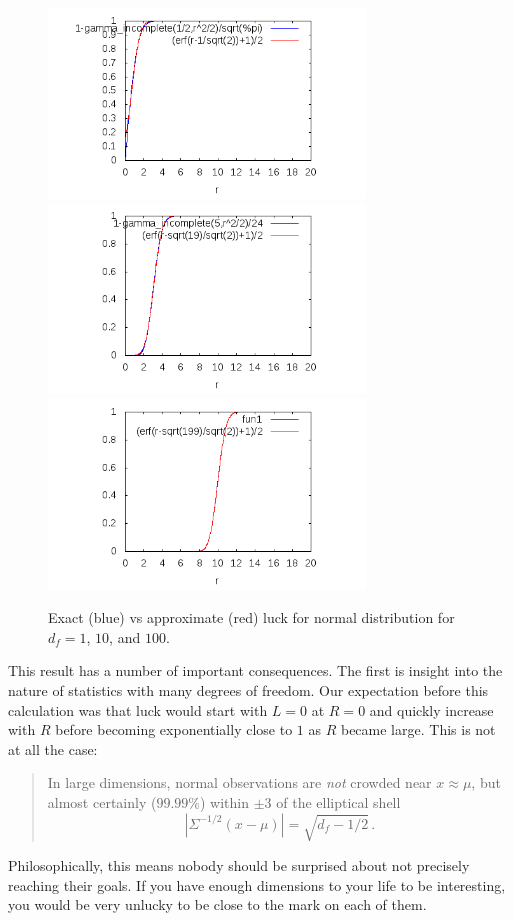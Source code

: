 \begin{figure}
  \caption{Exact (blue) vs approximate (red) luck for normal distribution for $d_f=1$, $10$, and $100$.}
  \centering
    \includegraphics[width=0.75\textwidth]{img/luck1}
    \includegraphics[width=0.75\textwidth]{img/luck10}
    \includegraphics[width=0.75\textwidth]{img/luck100}
\end{figure}

This result has a number of important consequences.  The first is insight into the nature of statistics with many degrees of freedom.  Our expectation before this calculation was that luck would start with $L=0$ at $R=0$ and quickly increase with $R$ before becoming exponentially close to $1$ as $R$ became large.  This is not at all the case:
\begin{quote}
  In large dimensions, normal observations are {\em not} crowded near $x \approx \mu$, but almost certainly ($99.99\%$) within $\pm 3$ of the elliptical shell
  \begin{equation*}
    |\Sigma^{-1/2}(x-\mu)|=\sqrt{d_f-1/2} \,.
  \end{equation*}
\end{quote}
Philosophically, this means nobody should be surprised about not precisely reaching their goals.  If you have enough dimensions to your life to be interesting, you would be very unlucky to be close to the mark on each of them.

